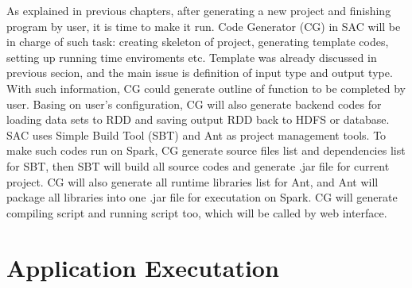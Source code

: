 
As explained in previous chapters, after generating a new project and finishing program by user, it is time to make it run. Code Generator (CG) in SAC will be in charge of such task: creating skeleton of project, generating template codes, setting up running time enviroments etc. Template was already discussed in previous secion, and the main issue is definition of input type and output type. With such information, CG could generate outline of function to be completed by user. Basing on user's configuration, CG will also generate backend codes for loading data sets to RDD and saving output RDD back to HDFS or database. SAC uses Simple Build Tool (SBT) \cite{ScalaSBT} and Ant \cite{ApacheAnt} as project management tools. To make such codes run on Spark, CG generate source files list and dependencies list for SBT, then SBT will build all source codes and generate .jar file for current project. CG will also generate all runtime libraries list for Ant, and Ant will package all libraries into one .jar file for executation on Spark. CG will generate compiling script and running script too, which will be called by web interface.


\section{Application Executation}

